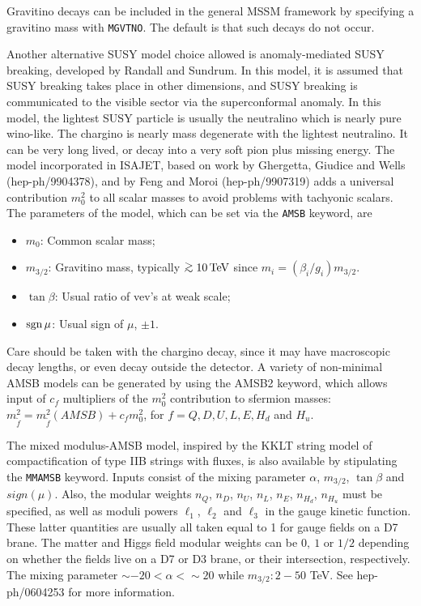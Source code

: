       Gravitino decays can be included in the general MSSM framework by
specifying a gravitino mass with \verb|MGVTNO|. The default is that such
decays do not occur.

\medskip

     Another alternative SUSY model choice allowed is anomaly-mediated
SUSY breaking, developed by Randall and Sundrum.  In this model, it is
assumed that SUSY breaking takes place in other dimensions, and SUSY
breaking is communicated to the visible sector via the superconformal
anomaly. In this model, the lightest SUSY particle is usually the
neutralino which is nearly pure wino-like. The chargino is nearly mass
degenerate with the lightest neutralino. It can be very long lived, or
decay into a very soft pion plus missing energy.  The model incorporated
in ISAJET, based on work by Ghergetta, Giudice and Wells
(hep-ph/9904378), and by Feng and Moroi (hep-ph/9907319) adds a
universal contribution $m_0^2$ to all scalar masses to avoid problems
with tachyonic scalars. The parameters of the model, which can be set
via the \verb|AMSB| keyword, are
\begin{itemize}
\item   $m_0$: Common scalar mass;
\item   $m_{3/2}$: Gravitino mass, typically $\simge 10\,{\rm TeV}$ since 
$m_i = (\beta_i/g_i) m_{3/2}$.
\item   $\tan\beta$: Usual ratio of vev's at weak scale;
\item   $\mathop{\rm sgn}\mu$: Usual sign of $\mu$, $\pm1$.
\end{itemize}
Care should be taken with the chargino decay, since it may have
macroscopic decay lengths, or even decay outside the detector.
A variety of non-minimal AMSB models can be generated by using the
AMSB2 keyword, which allows input of $c_f$ multipliers of 
the $m_0^2$ contribution to 
sfermion masses: $m_{\tilde f}^2=m_{\tilde f}^2(AMSB)+c_f m_0^2$, 
for $f=Q,D,U,L,E,H_d$ and $H_u$.

The mixed modulus-AMSB model, inspired by the KKLT string model of
compactification of type IIB strings with fluxes, 
is also available by stipulating the 
\verb|MMAMSB| keyword. Inputs consist of the mixing parameter $\alpha$,
$m_{3/2}$, $\tan\beta$ and $sign(\mu )$. Also, the modular weights
$n_Q$, $n_D$, $n_U$, $n_L$, $n_E$, $n_{H_d}$, $n_{H_u}$ must be specified,
as well as moduli powers $\ell_1$, $\ell_2$ and $\ell_3$ in the 
gauge kinetic function. These latter quantities are usually all 
taken equal to 1 for gauge fields on a D7 brane. The matter and Higgs field
modular weights can be $0,\ 1$ or $1/2$ depending on whether the 
fields live on a D7 or D3 brane, or their intersection, respectively.
The mixing parameter $\sim -20<\alpha < \sim 20$ while $m_{3/2}:2-50$ TeV.
See hep-ph/0604253 for more information.

